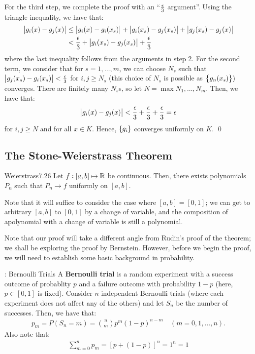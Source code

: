 \begin{nproof}
\begin{enumerate}
        For the third step, we complete the proof with an ``$\frac{\epsilon}{3}$ argument''. Using the triangle inequality, we have that:
        \begin{align*}
            \abs{g_i(x) - g_j(x)} &\leq \abs{g_i(x) - g_i(x_s)} + \abs{g_i(x_s) - g_j(x_s)} + \abs{g_j(x_s) - g_j(x)}
            \\ &< \frac{\epsilon}{3} + \abs{g_i(x_s) - g_j(x_s)} + \frac{\epsilon}{3}
        \end{align*}
        where the last inequality follows from the arguments in step 2. For the second term, we consider that for $s = 1, \ldots, m$, we can choose $N_s$ such that $\abs{g_j(x_s) - g_i(x_s)} < \frac{\epsilon}{3}$ for $i, j \geq N_s$ (this choice of $N_s$ is possible as $\set{g_n(x_s)})$ converges. There are finitely many $N_s$s, so let $N = \max{N_1, \ldots, N_m}$. Then, we have that:
        \begin{align*}
            \abs{g_i(x) - g_j(x)} < \frac{\epsilon}{3} + \frac{\epsilon}{3} + \frac{\epsilon}{3} = \epsilon    
        \end{align*}
        for $i, j \geq N$ and for all $x \in K$. Hence, $\set{g_i}$ converges uniformly on $K$. \qed
    \end{enumerate}
\end{nproof}

\subsection{The Stone-Weierstrass Theorem}

\begin{theorem}{Weierstrass}{7.26}
    Let $f: [a, b] \mapsto \mathbb{R}$ be continuous. Then, there exists polynomials $P_n$ such that $P_n \rightarrow f$ uniformly on $[a, b]$.
\end{theorem}
\noindent Note that it will suffice to consider the case where $[a, b] = [0, 1]$; we can get to arbitrary $[a, b]$ to $[0, 1]$ by a change of variable, and the composition of apolynomial with a change of variable is still a polynomial.

\noindent Note that our proof will take a different angle from Rudin's proof of the theorem; we shall be exploring the proof by Bernstein. However, before we begin the proof, we will need to establish some basic background in probability.

\begin{ndef}{: Bernoulli Trials}{}
    A \textbf{Bernoulli trial} is a random experiment with a success outcome of probablity $p$ and a failure outcome with probability $1 - p$ (here, $p \in [0, 1]$ is fixed). Consider $n$ independent Bernoulli trials (where each experiment does not affect any of the others) and let $S_n$ be the number of successes. Then, we have that:
    \begin{align*}
        p_m = P(S_n = m) = \binom{n}{m}p^m(1-p)^{n-m} \quad (m = 0, 1, \ldots, n).
    \end{align*}
    Also note that:
    \begin{align*}
        \sum_{m=0}^np_m = [p+(1-p)]^n = 1^n = 1
    \end{align*}
\end{ndef}

